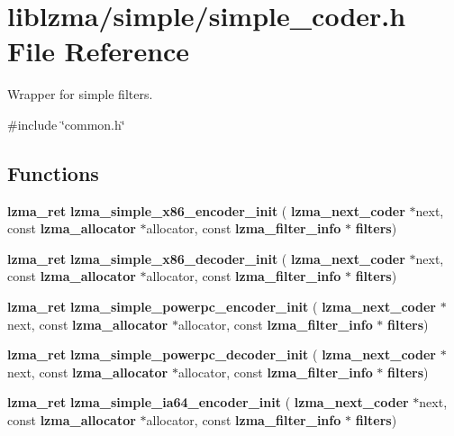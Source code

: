 \section{liblzma/simple/simple\+\_\+coder.h File Reference}
\label{simple__coder_8h}


Wrapper for simple filters.  


{\ttfamily \#include \char`\"{}common.\+h\char`\"{}}\newline
\subsection*{Functions}
\begin{DoxyCompactItemize}
\item 
\mbox{\label{simple__coder_8h_a232a17c84bf97656ad00ee3e3b17002f}} 
\textbf{ lzma\+\_\+ret} {\bfseries lzma\+\_\+simple\+\_\+x86\+\_\+encoder\+\_\+init} (\textbf{ lzma\+\_\+next\+\_\+coder} $\ast$next, const \textbf{ lzma\+\_\+allocator} $\ast$allocator, const \textbf{ lzma\+\_\+filter\+\_\+info} $\ast$\textbf{ filters})
\item 
\mbox{\label{simple__coder_8h_a5d78f5a48e0aac7e5148af990453f1b8}} 
\textbf{ lzma\+\_\+ret} {\bfseries lzma\+\_\+simple\+\_\+x86\+\_\+decoder\+\_\+init} (\textbf{ lzma\+\_\+next\+\_\+coder} $\ast$next, const \textbf{ lzma\+\_\+allocator} $\ast$allocator, const \textbf{ lzma\+\_\+filter\+\_\+info} $\ast$\textbf{ filters})
\item 
\mbox{\label{simple__coder_8h_aefddcb4b5f1e4a20a43062acc3e72f26}} 
\textbf{ lzma\+\_\+ret} {\bfseries lzma\+\_\+simple\+\_\+powerpc\+\_\+encoder\+\_\+init} (\textbf{ lzma\+\_\+next\+\_\+coder} $\ast$next, const \textbf{ lzma\+\_\+allocator} $\ast$allocator, const \textbf{ lzma\+\_\+filter\+\_\+info} $\ast$\textbf{ filters})
\item 
\mbox{\label{simple__coder_8h_a79c547328af2f05aaf36e0bdb4832b53}} 
\textbf{ lzma\+\_\+ret} {\bfseries lzma\+\_\+simple\+\_\+powerpc\+\_\+decoder\+\_\+init} (\textbf{ lzma\+\_\+next\+\_\+coder} $\ast$next, const \textbf{ lzma\+\_\+allocator} $\ast$allocator, const \textbf{ lzma\+\_\+filter\+\_\+info} $\ast$\textbf{ filters})
\item 
\mbox{\label{simple__coder_8h_adea1b525998a8edea8a6165a5249c1e1}} 
\textbf{ lzma\+\_\+ret} {\bfseries lzma\+\_\+simple\+\_\+ia64\+\_\+encoder\+\_\+init} (\textbf{ lzma\+\_\+next\+\_\+coder} $\ast$next, const \textbf{ lzma\+\_\+allocator} $\ast$allocator, const \textbf{ lzma\+\_\+filter\+\_\+info} $\ast$\textbf{ filters})

\end{DoxyCompactItemize}

